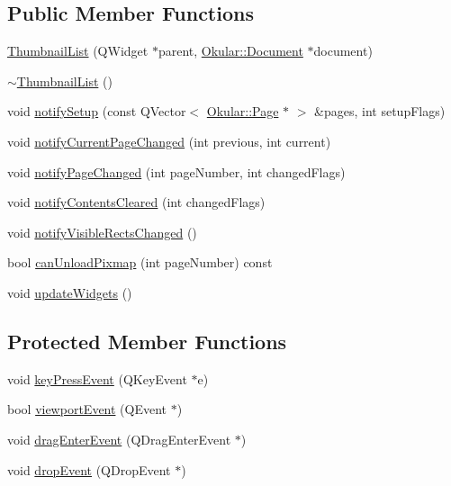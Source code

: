 \subsection*{Public Member Functions}
\begin{DoxyCompactItemize}
\item 
\hyperlink{classThumbnailList_a45adddadeb2103881c9cd8f4ee1553a9}{Thumbnail\+List} (Q\+Widget $\ast$parent, \hyperlink{classOkular_1_1Document}{Okular\+::\+Document} $\ast$document)
\item 
\hyperlink{classThumbnailList_a31bfc2342c868531907f31081e084b25}{$\sim$\+Thumbnail\+List} ()
\item 
void \hyperlink{classThumbnailList_af82e95598d7b7be22a368ddc769bf3b1}{notify\+Setup} (const Q\+Vector$<$ \hyperlink{classOkular_1_1Page}{Okular\+::\+Page} $\ast$ $>$ \&pages, int setup\+Flags)
\item 
void \hyperlink{classThumbnailList_a0c00a18ceb86706745b69e676fc88ca7}{notify\+Current\+Page\+Changed} (int previous, int current)
\item 
void \hyperlink{classThumbnailList_a1186ac57f00bed32df13098cfea02d3b}{notify\+Page\+Changed} (int page\+Number, int changed\+Flags)
\item 
void \hyperlink{classThumbnailList_af3bf55309904fca46e969e23484329ec}{notify\+Contents\+Cleared} (int changed\+Flags)
\item 
void \hyperlink{classThumbnailList_a6e85a07d48d20671af2b8b535df03d03}{notify\+Visible\+Rects\+Changed} ()
\item 
bool \hyperlink{classThumbnailList_a2e36dbd5758486176229709827e682b0}{can\+Unload\+Pixmap} (int page\+Number) const 
\item 
void \hyperlink{classThumbnailList_ae1b8a0ab9d95508f23a2ce679adbbe99}{update\+Widgets} ()
\end{DoxyCompactItemize}
\subsection*{Protected Member Functions}
\begin{DoxyCompactItemize}
\item 
void \hyperlink{classThumbnailList_a7bb68b3917a8064f6063997ffc9e41a6}{key\+Press\+Event} (Q\+Key\+Event $\ast$e)
\item 
bool \hyperlink{classThumbnailList_a7ab92edfd37d11f925c3f8a2088275c7}{viewport\+Event} (Q\+Event $\ast$)
\item 
void \hyperlink{classThumbnailList_ae908665e960e065082bc574026fe2bd9}{drag\+Enter\+Event} (Q\+Drag\+Enter\+Event $\ast$)
\item 
void \hyperlink{classThumbnailList_a8ca1c1b0e52b833f0596041a02221c4a}{drop\+Event} (Q\+Drop\+Event $\ast$)
\end{DoxyCompactItemize}
